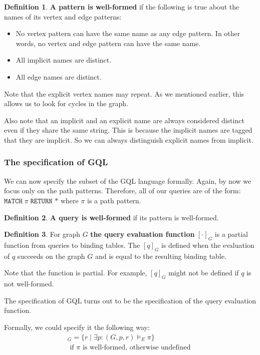 \documentclass[14pt]{constructor-thesis}
\theoremstyle{definition}
\newtheorem{definition}{Definition}
\begin{document}
\begin{definition}
  \textbf{A pattern is well-formed} if the following is true about the names of its vertex and edge patterns:
  \begin{itemize}
    \item No vertex pattern can have the same name as any edge pattern. In other words, no vertex and edge pattern can have the same name.
    \item All implicit names are distinct.
    \item All edge names are distinct.
  \end{itemize}
\end{definition}

Note that the explicit vertex names may repeat. As we mentioned earlier, this allows us to look for cycles in the graph.

Also note that an implicit and an explicit name are always considered distinct even if they share the same string. This is because the implicit names are tagged that they are implicit. So we can always distinguish explicit names from implicit.

\subsubsection{The specification of GQL}

We can now specify the subset of the GQL language formally.
Again, by now we focus only on the path patterns. Therefore, all of our queries are of the form: $\texttt{MATCH} \; \pi \; \texttt{RETURN *}$ where $\pi$ is a path pattern. 

\begin{definition}
  \textbf{A query is well-formed} if its pattern is well-formed.
\end{definition}

\begin{definition}
  For graph $G$ \textbf{the query evaluation function} $[ \cdot ]_G$ is a partial function from queries to binding tables. The $[q]_G$ is defined when the evaluation of $q$ succeeds on the graph $G$ and is equal to the resulting binding table.
\end{definition}

Note that the function is partial. For example, $[q]_G$ might not be defined if $q$ is not well-formed.

The specification of GQL turns out to be the specification of the query evaluation function.

Formally, we could specify it the following way:
\begin{align*}
  [\texttt{MATCH} \; \pi \; \texttt{RETURN *}]_G = \{ r \mid \exists p : (G, p, r) \models_E \pi \} \\ \text{ if $\pi$ is well-formed, otherwise undefined }
\end{align*} 
\end{document}
